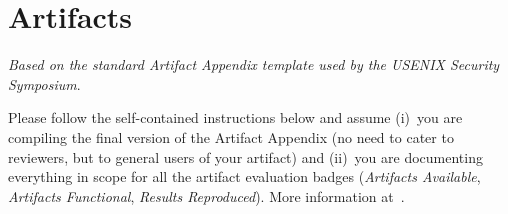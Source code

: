 \section*{Artifacts}\label{s:artifact-appendix}

\emph{Based on the standard Artifact Appendix template used by the USENIX Security
Symposium}.

Please follow the self-contained instructions below and assume
(i)~you are compiling the final version of the Artifact Appendix (no need to
cater to reviewers, but to general users of your artifact) and (ii)~you are
documenting everything in scope for all the artifact evaluation badges
(\emph{Artifacts Available}, \emph{Artifacts Functional}, \emph{Results
Reproduced}). More information at~\cite{secartifacts}.


\fi


